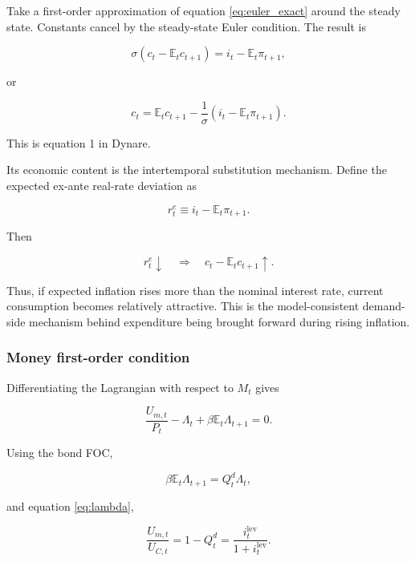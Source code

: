 Take a first-order approximation of equation \eqref{eq:euler_exact} around the
steady state. Constants cancel by the steady-state Euler condition. The
result is

\begin{equation}
\sigma
\left(
c_t-\mathbb E_tc_{t+1}
\right)
=
i_t-\mathbb E_t\pi_{t+1},
\end{equation}

or

\begin{equation}
\boxed{
c_t
=
\mathbb E_tc_{t+1}
-
\frac{1}{\sigma}
\left(
i_t-\mathbb E_t\pi_{t+1}
\right).
}
\label{eq:euler_final}
\end{equation}

This is equation 1 in Dynare.

Its economic content is the intertemporal substitution mechanism. Define the
expected ex-ante real-rate deviation as

\begin{equation}
r_t^{e}
\equiv
i_t-\mathbb E_t\pi_{t+1}.
\end{equation}

Then

\[
r_t^e\downarrow
\quad\Longrightarrow\quad
c_t-\mathbb E_tc_{t+1}\uparrow.
\]

Thus, if expected inflation rises more than the nominal interest rate, current
consumption becomes relatively attractive. This is the model-consistent
demand-side mechanism behind expenditure being brought forward during rising
inflation.

\subsubsection{Money first-order condition}

Differentiating the Lagrangian with respect to \(M_t\) gives

\begin{equation}
\frac{U_{m,t}}{P_t}
-
\Lambda_t
+
\beta\mathbb E_t\Lambda_{t+1}
=
0.
\end{equation}

Using the bond FOC,

\[
\beta\mathbb E_t\Lambda_{t+1}
=
Q_t^d\Lambda_t,
\]

and equation \eqref{eq:lambda},

\begin{equation}
\frac{U_{m,t}}{U_{C,t}}
=
1-Q_t^d
=
\frac{i_t^{\mathrm{lev}}}{1+i_t^{\mathrm{lev}}}.
\label{eq:money_foc_exact}
\end{equation}

